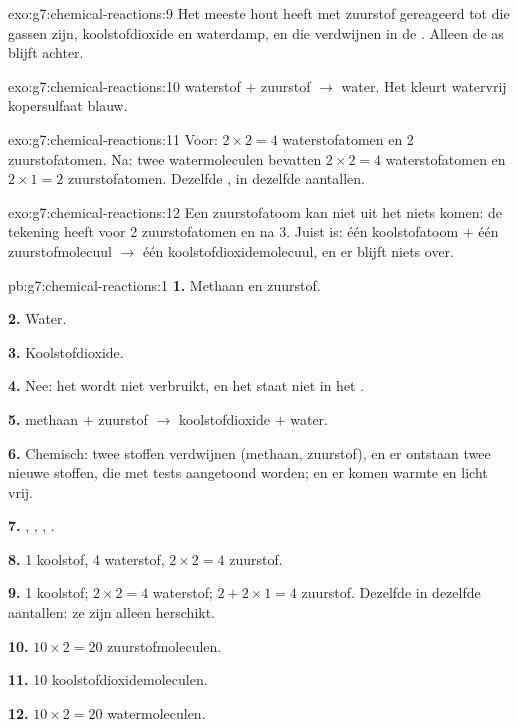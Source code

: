 \begin{solution}{exo:g7:chemical-reactions:9}
Het meeste hout heeft met zuurstof gereageerd tot  die
gassen zijn, koolstofdioxide en waterdamp, en die verdwijnen in de
. Alleen de as blijft achter.
\end{solution}

\begin{solution}{exo:g7:chemical-reactions:10}
waterstof $+$ zuurstof $\longrightarrow$ water. Het 
kleurt watervrij kopersulfaat blauw.
\end{solution}

\begin{solution}{exo:g7:chemical-reactions:11}
Voor: $2 \times 2 = 4$ waterstofatomen en 2 zuurstofatomen. Na: twee
watermoleculen bevatten $2 \times 2 = 4$ waterstofatomen en $2 \times 1 =
2$ zuurstofatomen. Dezelfde , in dezelfde aantallen.
\end{solution}

\begin{solution}{exo:g7:chemical-reactions:12}
Een zuurstofatoom kan niet uit het niets komen: de tekening heeft voor
2 zuurstofatomen en na 3. Juist is: één koolstofatoom $+$ één
zuurstofmolecuul $\longrightarrow$ één koolstofdioxidemolecuul, en er
blijft niets over.
\end{solution}

\begin{solution}{pb:g7:chemical-reactions:1}
\textbf{1.} Methaan en zuurstof.

\textbf{2.} Water.

\textbf{3.} Koolstofdioxide.

\textbf{4.} Nee: het wordt niet verbruikt, en het staat niet in het
.

\textbf{5.} methaan $+$ zuurstof $\longrightarrow$ koolstofdioxide $+$
water.

\textbf{6.} Chemisch: twee stoffen verdwijnen (methaan, zuurstof), en er
ontstaan twee nieuwe stoffen, die met tests aangetoond worden; en er
komen warmte en licht vrij.

\textbf{7.} , , , .

\textbf{8.} 1 koolstof, 4 waterstof, $2 \times 2 = 4$ zuurstof.

\textbf{9.} 1 koolstof; $2 \times 2 = 4$ waterstof; $2 + 2 \times 1 = 4$
zuurstof. Dezelfde  in dezelfde aantallen: ze zijn alleen
herschikt.

\textbf{10.} $10 \times 2 = 20$ zuurstofmoleculen.

\textbf{11.} 10 koolstofdioxidemoleculen.

\textbf{12.} $10 \times 2 = 20$ watermoleculen.
\end{solution}
